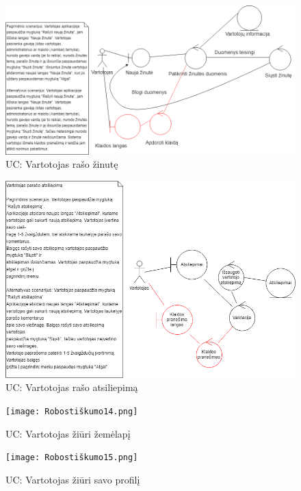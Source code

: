 \documentclass[oneside]{VUMIFPSkursinis}
\begin{document}
\begin{figure}[h]
    \centering
    \includegraphics[width=1.0\textwidth]{Rob11.png}
    \caption{UC: Vartotojas rašo žinutę}
    \label{fig:rob11}
\end{figure}
\vskip 1cm

\begin{figure}[h]
    \centering
    \includegraphics[width=1.0\textwidth]{rob12.png}
    \caption{UC: Vartotojas rašo atsiliepimą}
    \label{fig:rob12}
\end{figure}
\vskip 1cm

\begin{figure}[h]
    \centering
    \texttt{[image: Robostiškumo14.png]}
    \caption{UC: Vartotojas žiūri žemėlapį}
    \label{fig:rob14-2}
\end{figure}
\vskip 1cm

\begin{figure}[h]
    \centering
    \texttt{[image: Robostiškumo15.png]}
    \caption{UC: Vartotojas žiūri savo profilį}
    \label{fig:rob15}
\end{figure}
\vskip 1cm
\end{document}
